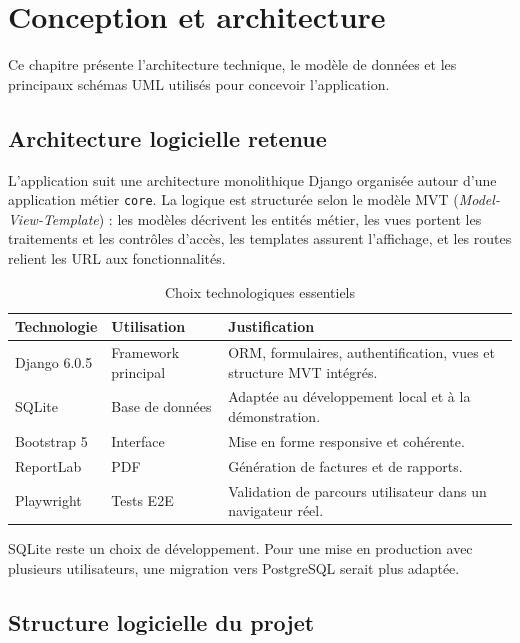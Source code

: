\chapter{Conception et architecture}

Ce chapitre présente l'architecture technique, le modèle de données et les principaux schémas UML utilisés pour concevoir l'application.

\section{Architecture logicielle retenue}

L'application suit une architecture monolithique Django organisée autour d'une application métier \texttt{core}. La logique est structurée selon le modèle MVT (\textit{Model-View-Template}) : les modèles décrivent les entités métier, les vues portent les traitements et les contrôles d'accès, les templates assurent l'affichage, et les routes relient les URL aux fonctionnalités.

\begin{table}[H]
\centering
\caption{Choix technologiques essentiels}
\begin{tabularx}{\textwidth}{|l|X|X|}
\hline
\textbf{Technologie} & \textbf{Utilisation} & \textbf{Justification} \\
\hline
Django 6.0.5 \cite{django} & Framework principal & ORM, formulaires, authentification, vues et structure MVT intégrés. \\
\hline
SQLite \cite{sqlite} & Base de données & Adaptée au développement local et à la démonstration. \\
\hline
Bootstrap 5 \cite{bootstrap} & Interface & Mise en forme responsive et cohérente. \\
\hline
ReportLab \cite{reportlab} & PDF & Génération de factures et de rapports. \\
\hline
Playwright \cite{playwright} & Tests E2E & Validation de parcours utilisateur dans un navigateur réel. \\
\hline
\end{tabularx}
\end{table}

SQLite reste un choix de développement. Pour une mise en production avec plusieurs utilisateurs, une migration vers PostgreSQL serait plus adaptée.

\section{Structure logicielle du projet}

